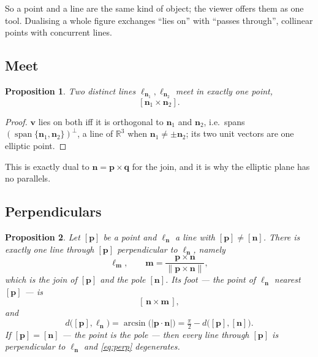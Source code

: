 \documentclass[11pt,a4paper]{article}
\newcommand{\R}{\mathbb{R}}
\newcommand{\nvec}{\mathbf{n}}
\newcommand{\vv}{\mathbf{v}}
\newcommand{\pp}{\mathbf{p}}
\newcommand{\qq}{\mathbf{q}}
\newcommand{\mm}{\mathbf{m}}
\newcommand{\norm}[1]{\lVert #1 \rVert}
\newcommand{\abs}[1]{\lvert #1 \rvert}
\theoremstyle{plain}
\newtheorem{proposition}{Proposition}[section]
\theoremstyle{definition}
\theoremstyle{remark}
\begin{document}
So a point and a line are the same kind of object; the viewer offers them as one
tool. Dualising a whole figure exchanges ``lies on'' with ``passes through'',
collinear points with concurrent lines.

\subsection{Meet}
\label{sec:meet}

\begin{proposition}
Two distinct lines $\ell_{\nvec_1},\ell_{\nvec_2}$ meet in exactly one point,
\begin{equation}
  \label{eq:meet}
  [\nvec_1\times\nvec_2].
\end{equation}
\end{proposition}

\begin{proof}
$\vv$ lies on both iff it is orthogonal to $\nvec_1$ and $\nvec_2$, i.e.\ spans
$(\operatorname{span}\{\nvec_1,\nvec_2\})^{\perp}$, a line of $\R^3$ when
$\nvec_1\neq\pm\nvec_2$; its two unit vectors are one elliptic point.
\end{proof}

This is exactly dual to $\nvec=\pp\times\qq$ for the join, and it is why the
elliptic plane has no parallels.

\subsection{Perpendiculars}

\begin{proposition}
\label{prop:perp}
Let $[\pp]$ be a point and $\ell_\nvec$ a line with $[\pp]\neq[\nvec]$. There is
exactly one line through $[\pp]$ perpendicular to $\ell_\nvec$, namely
\begin{equation}
  \label{eq:perp}
  \ell_\mm,\qquad \mm=\frac{\pp\times\nvec}{\norm{\pp\times\nvec}},
\end{equation}
which is the join of $[\pp]$ and the pole $[\nvec]$. Its foot --- the point of
$\ell_\nvec$ nearest $[\pp]$ --- is
\begin{equation}
  \label{eq:foot}
  [\,\nvec\times\mm\,],
\end{equation}
and
\begin{equation}
  \label{eq:dist-to-line}
  d\bigl([\pp],\ell_\nvec\bigr)=\arcsin\bigl(\abs{\pp\cdot\nvec}\bigr)
  =\tfrac{\pi}{2}-d\bigl([\pp],[\nvec]\bigr).
\end{equation}
If $[\pp]=[\nvec]$ --- the point \emph{is} the pole --- then every line through
$[\pp]$ is perpendicular to $\ell_\nvec$ and \eqref{eq:perp} degenerates.
\end{proposition}
\end{document}
